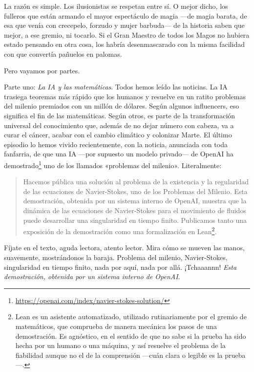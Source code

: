 \documentclass[11pt,a4paper]{article}
\begin{document}
La razón es simple. Los ilusionistas se respetan entre sí. O mejor dicho, los fulleros que están armando el mayor espectáculo de magia ---de magia barata, de esa que venía con crecepelo, forzudo y mujer barbuda--- de la historia saben que mejor, a ese gremio, ni tocarlo. Si el Gran Maestro de todos los Magos no hubiera estado pensando en otra cosa, los habría desenmascarado con la misma facilidad con que convertía pañuelos en palomas.

Pero vayamos por partes.

Parte uno: \emph{La IA y las matemáticas}. Todos hemos leído las noticias. La IA trasiega teoremas más rápido que los humanos y resuelve en un ratito problemas del milenio premiados con un millón de dólares. Según algunos influencers, eso significa el fin de las matemáticas. Según otros, es parte de la transformación universal del conocimiento que, además de no dejar número con cabeza, va a curar el cáncer, acabar con el cambio climático y colonizar Marte. El último episodio lo hemos vivido recientemente, con la noticia, anunciada con toda fanfarria, de que una IA ---por supuesto un modelo privado--- de OpenAI ha demostrado\footnote{\url{https://openai.com/index/navier-stokes-solution/}} uno de los llamados «problemas del milenio». Literalmente:

\begin{quotation}
Hacemos pública una solución al problema de la existencia y la regularidad de las ecuaciones de Navier-Stokes, uno de los Problemas del Milenio. Esta demostración, obtenida por un sistema interno de OpenAI, muestra que la dinámica de las ecuaciones de Navier-Stokes para el movimiento de fluidos puede desarrollar una singularidad en tiempo finito. Publicamos tanto una exposición de la demostración como una formalización en Lean\footnote{Lean es un asistente automatizado, utilizado rutinariamente por el gremio de matemáticos, que comprueba de manera mecánica los pasos de una demostración. Es agnóstico, en el sentido de que no sabe si la prueba ha sido hecha por un humano o una máquina, y así resuelve el problema de la fiabilidad aunque no el de la comprensión ---cuán clara o legible es la prueba---.}.
\end{quotation}

Fíjate en el texto, aguda lectora, atento lector. Mira cómo se mueven las manos, suavemente, mostrándonos la baraja. Problema del milenio, Navier-Stokes, singularidad en tiempo finito, nada por aquí, nada por allá. ¡Tchaaannn! \emph{Esta demostración, obtenida por un sistema interno de OpenAI}.
\end{document}
